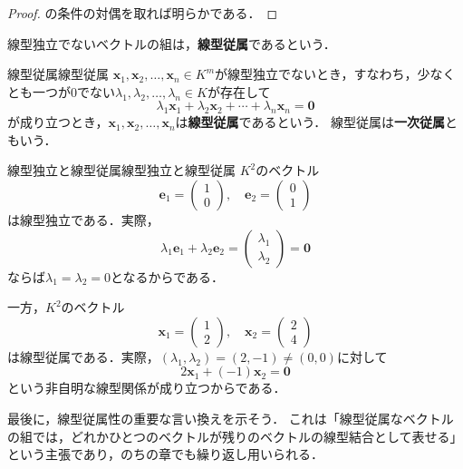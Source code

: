 \begin{leftbar}
\begin{proof}
  の条件の対偶を取れば明らかである．
\end{proof}
\end{leftbar}

線型独立でないベクトルの組は，\textbf{線型従属}であるという．

\begin{definition}{線型従属}{線型従属}
  $\bm{x}_1, \bm{x}_2, \dots, \bm{x}_n \in K^m$が線型独立でないとき，すなわち，少なくとも一つが$0$でない$\lambda_1, \lambda_2, \dots, \lambda_n \in K$が存在して
  \[
    \lambda_1 \bm{x}_1 + \lambda_2 \bm{x}_2 + \cdots + \lambda_n \bm{x}_n = \bm{0}
  \]
  が成り立つとき，$\bm{x}_1, \bm{x}_2, \dots, \bm{x}_n$は\textbf{線型従属}であるという．
  線型従属は\textbf{一次従属}ともいう．
\end{definition}

\begin{example}{線型独立と線型従属}{線型独立と線型従属}
  $K^2$のベクトル
  \[
    \bm{e}_1 = \begin{pmatrix} 1 \\ 0 \end{pmatrix}, \quad
    \bm{e}_2 = \begin{pmatrix} 0 \\ 1 \end{pmatrix}
  \]
  は線型独立である．実際，
  \[
    \lambda_1 \bm{e}_1 + \lambda_2 \bm{e}_2 = \begin{pmatrix} \lambda_1 \\ \lambda_2 \end{pmatrix} = \bm{0}
  \]
  ならば$\lambda_1 = \lambda_2 = 0$となるからである．

  一方，$K^2$のベクトル
  \[
    \bm{x}_1 = \begin{pmatrix} 1 \\ 2 \end{pmatrix}, \quad
    \bm{x}_2 = \begin{pmatrix} 2 \\ 4 \end{pmatrix}
  \]
  は線型従属である．実際，$(\lambda_1, \lambda_2) = (2, -1) \ne (0, 0)$に対して
  \[
    2\bm{x}_1 + (-1)\bm{x}_2 = \bm{0}
  \]
  という非自明な線型関係が成り立つからである．
\end{example}

最後に，線型従属性の重要な言い換えを示そう．
これは「線型従属なベクトルの組では，どれかひとつのベクトルが残りのベクトルの線型結合として表せる」という主張であり，のちの章でも繰り返し用いられる．

